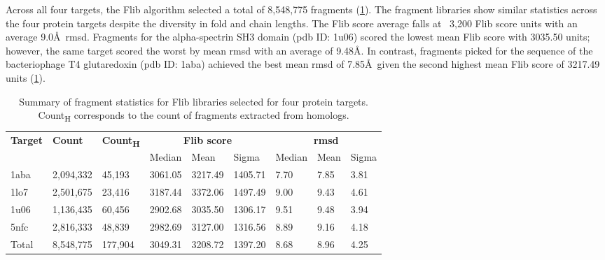 Across all four targets, the Flib algorithm selected a total of 8,548,775 fragments (\cref{table:ample_flib_frag_summary}). The fragment libraries show similar statistics across the four protein targets despite the diversity in fold and chain lengths. The Flib score average falls at ~3,200 Flib score units with an average 9.0\AA\ \gls{rmsd}. Fragments for the alpha-spectrin SH3 domain (\gls{pdb} ID: 1u06) scored the lowest mean Flib score with 3035.50 units; however, the same target scored the worst by mean \gls{rmsd} with an average of 9.48\AA. In contrast, fragments picked for the sequence of the bacteriophage T4 glutaredoxin (\gls{pdb} ID: 1aba) achieved the best mean \gls{rmsd} of 7.85\AA\ given the second highest mean Flib score of 3217.49 units (\cref{table:ample_flib_frag_summary}).

\begin{table}[H]
  \centering
  \scriptsize
  \caption[Flib fragment characterics across four protein targets]{Summary of fragment statistics for Flib libraries selected for four protein targets. Count\textsubscript{H} corresponds to the count of fragments extracted from homologs.}
  \label{table:ample_flib_frag_summary}
  \begin{tabularx}{\textwidth}{X X X X X X X X X}
      \hline
      \multirow{2}{*}{\textbf{Target}} & \multirow{2}{*}{\textbf{Count}} & \multirow{2}{*}{\textbf{Count\textsubscript{H}}} & \multicolumn{3}{c}{\textbf{Flib score}} & \multicolumn{3}{c}{\textbf{\gls{rmsd}}} \\ \cline{4-9}
      		&			&			& Median 	& Mean 		& Sigma 	& Median 	& Mean 	& Sigma \\
      
      \hline
	  1aba	& 2,094,332	& 45,193	& 3061.05	& 3217.49	& 1405.71	& 7.70		& 7.85	& 3.81	\\
  	  1lo7  & 2,501,675	& 23,416	& 3187.44	& 3372.06	& 1497.49	& 9.00		& 9.43	& 4.61  \\
      1u06  & 1,136,435	& 60,456	& 2902.68	& 3035.50	& 1306.17	& 9.51		& 9.48	& 3.94	\\
      5nfc  & 2,816,333	& 48,839	& 2982.69	& 3127.00	& 1316.56	& 8.89		& 9.16	& 4.18	\\ 
      \hline
      Total	& 8,548,775	& 177,904	& 3049.31	& 3208.72	& 1397.20	& 8.68		& 8.96	& 4.25	\\ 
      \hline
  \end{tabularx}
\end{table}

